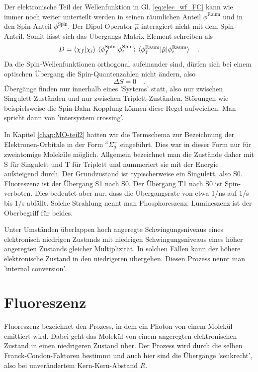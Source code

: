 Der elektronische Teil der Wellenfunktion in Gl. \ref{eq:elec_wf_FC} kann wie immer noch weiter unterteilt werden in seinen räumlichen Anteil $\phi^\text{Raum}$ und in den Spin-Anteil  $\phi^\text{Spin}$. Der Dipol-Operator $\hat{\mu}$ interagiert nicht mit dem Spin-Anteil. Somit lässt sich das Übergangs-Matrix-Element schreiben als
\begin{equation}
 D =   \braket{\chi_f | \chi_i} \,    \braket{\phi^\text{Spin}_f | \phi^\text{Spin}_i}  \,
  \braket{\phi^\text{Raum}_f | \hat{\mu} | \phi^\text{Raum}_i}  \quad .
\end{equation}
Da die Spin-Wellenfunktionen orthogonal aufeinander sind, dürfen sich bei einem optischen Übergang die Spin-Quantenzahlen nicht ändern, also
\begin{equation}
 \Delta S = 0 \quad .
\end{equation}
Übergänge finden nur innerhalb eines 'Systems' statt, also nur zwischen  Singulett-Zuständen und nur zwischen   Triplett-Zuständen.
Störungen wie beispielsweise die Spin-Bahn-Kopplung können diese Regel aufweichen. Man spricht dann von 'intersystem crossing'.

In Kapitel \ref{chap:MO-teil2} hatten wir die Termschema zur Bezeichnung der Elektronen-Orbitale in der Form  $^3\Sigma_g^- $ eingeführt. Dies war in dieser Form nur für zweiatomige Moleküle möglich. Allgemein bezeichnet man die Zustände daher mit S für Singulett und T für Triplett und nummeriert sie mit der Energie aufsteigend durch. Der Grundzustand ist typischerweise ein Singulett, also S0. Fluoreszenz ist der Übergang S1 nach S0. Der Übergang T1 nach S0 ist Spin-verboten. Dies bedeutet aber nur, dass die Übergangsrate von etwa 1/ns auf 1/\textmu s bis 1/s abfällt. Solche Strahlung nennt man Phosphoreszenz. Lumineszenz ist der Oberbegriff für beides. 

Unter Umständen überlappen hoch angeregte Schwingungsniveaus eines elektronisch niedrigen Zustands mit niedrigen Schwingungsniveaus eines höher angeregten Zustands gleicher Multiplizität. In solchen Fällen kann der höhere elektronische Zustand in den niedrigeren übergehen. Diesen Prozess nennt man 'internal conversion'.


\section{Fluoreszenz}

Fluoreszenz bezeichnet den Prozess, in dem ein Photon von einem Molekül emittiert wird. Dabei geht das Molekül von einem angeregten elektronischen Zustand in einen niedrigeren Zustand über. Der Prozess wird durch die selben Franck-Condon-Faktoren bestimmt und auch hier sind die Übergänge 'senkrecht', also bei unverändertem Kern-Kern-Abstand $R$.


